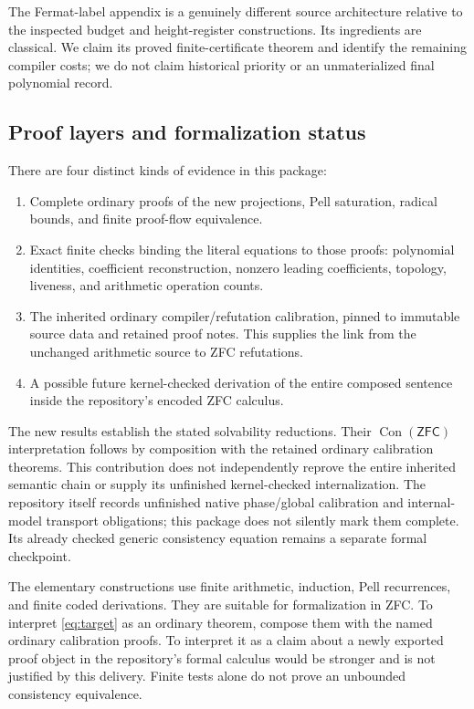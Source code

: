 \documentclass[11pt]{article}
\theoremstyle{definition}
\theoremstyle{remark}
\newcommand{\Con}{\operatorname{Con}}
\newcommand{\ZFC}{\mathsf{ZFC}}
\begin{document}
The Fermat-label appendix is a genuinely different source architecture
relative to the inspected budget and height-register constructions. Its
ingredients are classical. We claim its proved finite-certificate theorem
and identify the remaining compiler costs; we do not claim historical
priority or an unmaterialized final polynomial record.

\subsection{Proof layers and formalization status}\label{sec:boundary}

There are four distinct kinds of evidence in this package:
\begin{enumerate}
 \item Complete ordinary proofs of the new projections, Pell saturation,
       radical bounds, and finite proof-flow equivalence.
 \item Exact finite checks binding the literal equations to those proofs:
       polynomial identities, coefficient reconstruction, nonzero leading
       coefficients, topology, liveness, and arithmetic operation counts.
 \item The inherited ordinary compiler/refutation calibration, pinned to
       immutable source data and retained proof notes. This supplies the
       link from the unchanged arithmetic source to ZFC refutations.
 \item A possible future kernel-checked derivation of the entire composed
       sentence inside the repository's encoded ZFC calculus.
\end{enumerate}
The new results establish the stated solvability reductions. Their
$\Con(\ZFC)$ interpretation follows by composition with the retained ordinary
calibration theorems. This contribution does not independently reprove the
entire inherited semantic chain or supply its unfinished kernel-checked
internalization. The repository itself records unfinished native
phase/global calibration and internal-model transport obligations; this
package does not silently mark them complete. Its already checked generic
consistency equation remains a separate formal checkpoint.

The elementary constructions use finite arithmetic, induction, Pell
recurrences, and finite coded derivations. They are suitable for
formalization in ZFC. To interpret \eqref{eq:target} as an ordinary theorem,
compose them with the named ordinary calibration proofs. To interpret it
as a claim about a newly exported proof object in the repository's formal
calculus would be stronger and is not justified by this delivery. Finite
tests alone do not prove an unbounded consistency equivalence.
\end{document}
